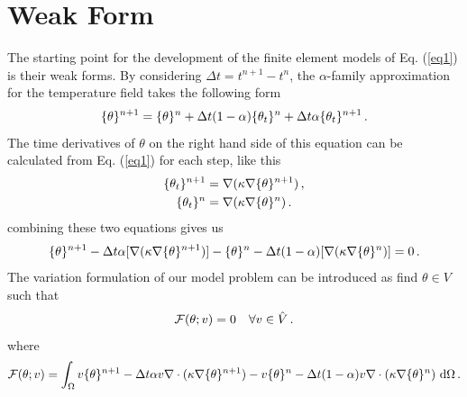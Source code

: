 \documentclass[]{article}
\begin{document}
\section{Weak Form} \label{sec: WF}
The starting point for the development of the finite element models of Eq. (\ref{eq1}) is their weak forms. By considering $\Delta t = t^{n+1} - t^{n}$, the $\alpha$-family approximation for the temperature field takes the following form
\begin{equation}\label{eq5}
	\begin{aligned}
		\{\theta\}^{n+1} = \{\theta\}^n + \Delta t(1 - \alpha)\{\theta_t\}^n + \Delta t\alpha\{\theta_t\}^{n+1}\thinspace.
	\end{aligned}
\end{equation}
The time derivatives of $\theta$ on the right hand side of this equation can be calculated from Eq. (\ref{eq1}) for each step, like this 
\begin{equation}\label{eq6}
	\begin{aligned}
		\{\theta_t\}^{n+1} &= \nabla(\kappa\nabla\{ \theta\}^{n+1})\thinspace, \\
		\{\theta_t\}^{n} &= \nabla (\kappa\nabla\{ \theta\}^{n})\thinspace. \
	\end{aligned}
\end{equation}
combining these two equations gives us
\begin{equation}\label{eq7}
	\begin{aligned}
		\{\theta\}^{n+1} -\Delta t\alpha[\nabla(\kappa \nabla\{\theta\}^{n+1})] - \{\theta\}^n - \Delta t(1 - \alpha)[\nabla(\kappa \nabla\{\theta\}^{n})]=0\thinspace.
	\end{aligned}
\end{equation}
The variation formulation of our model problem can be introduced as find $\theta \in V$ such that
\begin{equation}\label{eq8}
	\begin{aligned}
		\mathcal{F}(\theta;v) = 0 \quad \forall v \in \hat{V}\thinspace.
	\end{aligned}
\end{equation}
where
\begin{equation}\label{eq9}
	\begin{aligned}
		\mathcal{F}(\theta; v) =\int_{\Omega} v\{\theta\}^{n+1} -\Delta t\alpha v\nabla \cdot(\kappa \nabla\{ \theta\}^{n+1}) - v\{\theta\}^n - \Delta t(1 - \alpha)v\nabla \cdot(\kappa \nabla \{\theta\}^{n})\ \mathrm{d}\Omega \thinspace .
	\end{aligned}
\end{equation}
\end{document}
